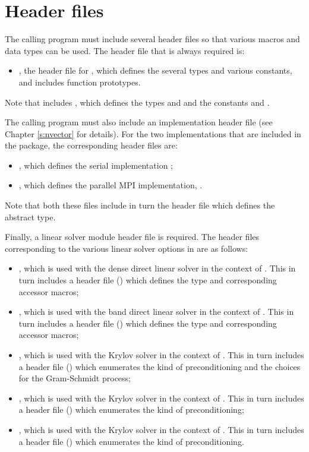 \section{Header files}\label{ss:header_sim}
The calling program must include several header files so that various macros
and data types can be used. The header file that is always required is:
\begin{itemize}
\item  {}, 
  the header file for {\ida}, which defines the several
  types and various constants, and includes function prototypes.
\end{itemize}
Note that  includes , 
which defines the types  and 
and the constants  and .

The calling program must also include an {\nvector} implementation header file
(see Chapter \ref{s:nvector} for details).
For the two {\nvector} implementations that are included in the {\ida} package,
the corresponding header files are:
\begin{itemize}
\item {}, 
  which defines the serial implementation {\nvecs};
\item {}, 
  which defines the parallel MPI implementation, {\nvecp}.
\end{itemize}
Note that both these files include in turn the header file  which 
defines the abstract  type. 

Finally, a linear solver module header file is required. 
The header files corresponding to the various linear solver options in {\ida} are
as follows:
\begin{itemize}
\item {}, 
  which is used with the dense direct linear solver in 
  the context of {\ida}. This in turn includes a header file ()
  which defines the  type and corresponding accessor macros; 
\item {}, 
  which is used with the band direct linear solver in the
  context of {\ida}. This in turn includes a header file ()
  which defines the  type and corresponding accessor macros;
\item {}, 
  which is used with the Krylov solver {\spgmr} in the
  context of {\ida}. This in turn includes a header file ()
  which enumerates the kind of preconditioning and the choices for the
  Gram-Schmidt process;
\item {}, 
  which is used with the Krylov solver {\spbcg} in the
  context of {\ida}. This in turn includes a header file ()
  which enumerates the kind of preconditioning;
\item {}, 
  which is used with the Krylov solver {\sptfqmr} in the
  context of {\ida}. This in turn includes a header file ()
  which enumerates the kind of preconditioning.
\end{itemize}

